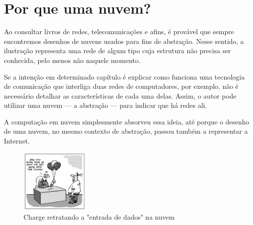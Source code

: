 \section{Por que uma nuvem?}

Ao consultar livros de redes, telecomunicações e afins, é provável que sempre
encontremos desenhos de nuvens usados para fins de abstração. Nesse sentido, a
ilustração representa uma rede de algum tipo cuja estrutura não precisa ser
conhecida, pelo menos não naquele momento.

Se a intenção em determinado capítulo é explicar como funciona uma tecnologia de
comunicação que interliga duas redes de computadores, por exemplo, não é
necessário detalhar as características de cada uma delas. Assim, o autor pode
utilizar uma nuvem --- a abstração --- para indicar que há redes ali.

A computação em nuvem simplesmente absorveu essa ideia, até porque o desenho de
uma nuvem, no mesmo contexto de abstração, passou também a representar a
Internet.

\begin{figure}[ht]
    \centering
    \includegraphics[width=0.3\textwidth]{img/comic.jpg}
    \caption{Charge 
    retratando a "entrada de dados" na nuvem~\cite{cloudtweaks-comic-cloud}}
\end{figure}
